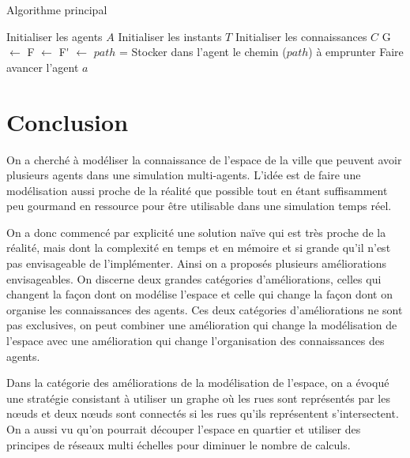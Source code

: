 \documentclass[a4paper]{article}
\begin{document}
\begin{algorithm}%
  \caption{Algorithme principal}
  \begin{algorithmic}
    \State Initialiser les agents $A$
    \State Initialiser les instants $T$
    \State Initialiser les connaissances $C$
    \State \gls{G} $\gets$ 
    \State \gls{F} $\gets$ 
    \State \gls{F'} $\gets$ 
          \State $path$ = 
          \State Stocker dans l'agent le chemin ($path$) à emprunter
        \EndIf
        \State Faire avancer l'agent $a$
          \State {}
        \EndIf
      \EndFor
    \EndFor
  \end{algorithmic}
\end{algorithm}%

\section{Conclusion}

On a cherché à modéliser la connaissance de l'espace de la ville que peuvent
avoir plusieurs agents dans une simulation multi-agents. L'idée est de faire une
modélisation aussi proche de la réalité que possible tout en étant suffisamment
peu gourmand en ressource pour être utilisable dans une simulation temps réel.

On a donc commencé par explicité une solution naïve qui est très proche de la
réalité, mais dont la complexité en temps et en mémoire et si grande qu'il n'est
pas envisageable de l'implémenter. Ainsi on a proposés plusieurs améliorations
envisageables. On discerne deux grandes catégories d'améliorations, celles qui
changent la façon dont on modélise l'espace et celle qui change la façon dont on
organise les connaissances des agents. Ces deux catégories d'améliorations ne
sont pas exclusives, on peut combiner une amélioration qui change la
modélisation de l'espace avec une amélioration qui change l'organisation des
connaissances des agents.

Dans la catégorie des améliorations de la modélisation de l'espace, on a évoqué
une stratégie consistant à utiliser un graphe où les rues sont représentés par
les nœuds et deux nœuds sont connectés si les rues qu'ils représentent
s'intersectent. On a aussi vu qu'on pourrait découper l'espace en quartier et
utiliser des principes de réseaux multi échelles pour diminuer le nombre de
calculs.
\end{document}
